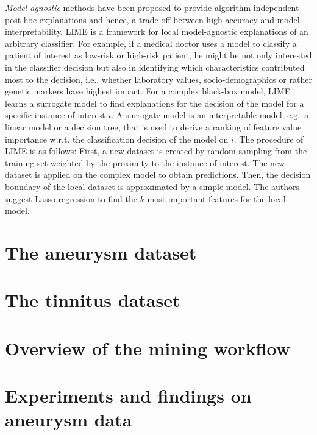 \documentclass[
]{book}
\begin{document}
\emph{Model-agnostic} methods have been proposed to provide algorithm-independent post-hoc explanations and hence, a trade-off between high accuracy and model interpretability.
LIME \autocite{RibeiroEtAl:KDD2016} is a framework for local model-agnostic explanations of an arbitrary classifier.
For example, if a medical doctor uses a model to classify a patient of interest as low-risk or high-risk patient, he might be not only interested in the classifier decision but also in identifying which characteristics contributed most to the decision, i.e., whether laboratory values, socio-demographics or rather genetic markers have highest impact.
For a complex black-box model, LIME learns a surrogate model to find explanations for the decision of the model for a specific instance of interest \(i\).
A surrogate model is an interpretable model, e.g.~a linear model or a decision tree, that is used to derive a ranking of feature value importance w.r.t. the classification decision of the model on \(i\).
The procedure of LIME is as follows:
First, a new dataset is created by random sampling from the training set weighted by the proximity to the instance of interest.
The new dataset is applied on the complex model to obtain predictions. Then, the decision boundary of the local dataset is approximated by a simple model.
The authors suggest Lasso regression to find the \(k\) most important features for the local model.

\hypertarget{the-aneurysm-dataset}{%
\section{The aneurysm dataset}\label{the-aneurysm-dataset}}

\hypertarget{the-tinnitus-dataset}{%
\section{The tinnitus dataset}\label{the-tinnitus-dataset}}

\hypertarget{overview-of-the-mining-workflow-2}{%
\section{Overview of the mining workflow}\label{overview-of-the-mining-workflow-2}}

\hypertarget{experiments-and-findings-on-aneurysm-data}{%
\section{Experiments and findings on aneurysm data}\label{experiments-and-findings-on-aneurysm-data}}
\end{document}

